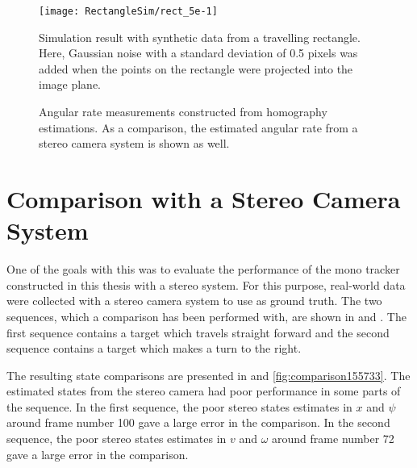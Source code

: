 \begin{figure}[!ht]
	\centering
	\texttt{[image: RectangleSim/rect\_5e-1]}
	\caption{\label{fig:rectsim5e-1} Simulation result with synthetic data from a travelling rectangle. Here, Gaussian noise with a standard deviation of 0.5 pixels was added when the points on the rectangle were projected into the image plane.}
\end{figure}

\begin{figure}[!ht]
	\centering

	\caption{\label{fig:angvelmeas} Angular rate measurements constructed from homography estimations. As a comparison, the estimated angular rate from a stereo camera system is shown as well.}
\end{figure}

\clearpage

\section{Comparison with a Stereo Camera System}
One of the goals with this \ms was to evaluate the performance of the mono tracker constructed in this thesis with a stereo system.
For this purpose, real-world data were collected with a stereo camera system to use as ground truth.
The two sequences, which a comparison has been performed with, are shown in  and .
The first sequence contains a target which travels straight forward and the second sequence contains a target which makes a turn to the right.

The resulting state comparisons are presented in  and \ref{fig:comparison155733}.
The estimated states from the stereo camera had poor performance in some parts of the sequence.
In the first sequence, the poor stereo states estimates in $x$ and $\psi$ around frame number 100 gave a large error in the comparison.
In the second sequence, the poor stereo states estimates in $v$ and $\omega$ around frame number 72 gave a large error in the comparison.

